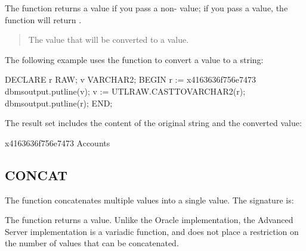\documentclass[letterpaper,10pt,english,openany,oneside]{sphinxmanual}
\begin{document}
The function returns a  value if you pass a non- value; if
you pass a  value, the function will return .


\begin{quote}

The  value that will be converted to a  value.
\end{quote}


The following example uses the  function to convert a
 value to a  string:

%
\begin{sphinxVerbatim}[commandchars=\\\{\}]
DECLARE
  r RAW;
  v VARCHAR2;
BEGIN
  r := \PYGZsq{}\PYGZbs{}x4163636f756e7473\PYGZsq{}
  dbms\PYGZus{}output.put\PYGZus{}line(v);
  v := UTL\PYGZus{}RAW.CAST\PYGZus{}TO\PYGZus{}VARCHAR2(r);
  dbms\PYGZus{}output.put\PYGZus{}line(r);
END;
\end{sphinxVerbatim}

The result set includes the content of the original string and the converted  value:

%
\begin{sphinxVerbatim}[commandchars=\\\{\}]
\PYGZbs{}x4163636f756e7473
Accounts
\end{sphinxVerbatim}

\newpage


\subsection{CONCAT}
\label{\detokenize{utl_raw:concat}}
The  function concatenates multiple  values into a single 
value. The signature is:
\begin{quote}

\end{quote}

The function returns a  value. Unlike the Oracle implementation, the
Advanced Server implementation is a variadic function, and does not
place a restriction on the number of values that can be concatenated.
\end{document}
